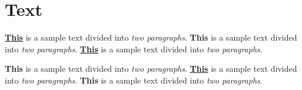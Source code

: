 \documentclass{article}
\begin{document}
\section{Text}
\underline{\textbf{This}} is a sample text divided into \emph{two paragraphs}. \textbf{This} is a sample text divided into \emph{two paragraphs}. \underline{\textbf{This}} is a sample text divided into \emph{two paragraphs}.\par \textbf{This} is a sample text divided into \emph{two paragraphs}. \underline{\textbf{This}} is a sample text divided into \emph{two paragraphs}. \textbf{This} is a sample text divided into \emph{two paragraphs}.
\end{document}

